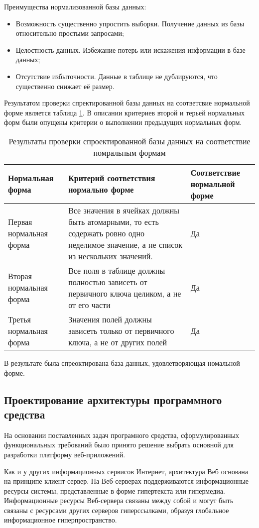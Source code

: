 Преимущества нормализованной базы данных:
\begin{itemize}
    \item Возможность существенно упростить выборки. Получение данных из базы относительно простыми запросами;
    \item Целостность данных. Избежание потерь или искажения информации в базе данных;
    \item Отсутствие избыточности. Данные в таблице не дублируются, что существенно снижает её размер.
\end{itemize}

Результатом проверки спректированной базы данных на соответсвие нормальной форме является таблица \ref{db:normal}.
В описании критериев второй и терьей нормальных форм были опущены критерии о выполнении предыдущих нормальных форм.

\begin{longtable}{ | p{4cm} | p{6cm} | p{4cm} | }
    \caption{Результаты проверки спроектированной базы данных на соответствие номральным формам}
    \label{db:normal}
    \endfirsthead
    \endhead
    \hline
    Нормальная форма  & Критерий соответствия нормально форме & Соответствие нормальной форме \\ \hline
    Первая нормальная форма & Все значения в ячейках должны быть атомарными, то есть содержать ровно одно неделимое значение, а не список из нескольких значений. & Да  \\ \hline
    Вторая нормальная форма & Все поля в таблице должны полностью зависеть от первичного ключа целиком, а не от его части & Да  \\ \hline
    Третья нормальная форма & Значения полей должны зависеть только от первичного ключа, а не от других полей & Да  \\
    \hline
\end{longtable}

В результате была спреоктирована база данных, удовлетворяющая номальной форме.

\subsection{Проектирование архитектуры программного средства}
На основании поставленных задач програмного средства, сформулированных функциональных требований было принято решение выбрать основной для разработки платформу веб-приложений.

Как и у других информационных сервисов Интернет, архитектура Веб основана на принципе клиент-сервер.
На Веб-серверах поддерживаются информационные ресурсы системы, представленные в форме гипертекста или гипермедиа.
Информационные ресурсы Веб-сервера связаны между собой и могут быть связаны с ресурсами других серверов гиперссылками, образуя глобальное информационное гиперпространство.

